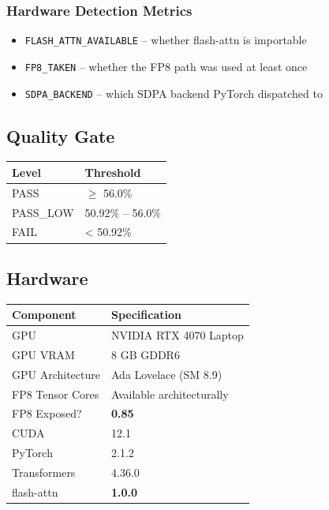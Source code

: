 \subsubsection{Hardware Detection Metrics}

\begin{itemize}
\item \texttt{FLASH\_ATTN\_AVAILABLE} -- whether flash-attn is importable
\item \texttt{FP8\_TAKEN} -- whether the FP8 path was used at least once
\item \texttt{SDPA\_BACKEND} -- which SDPA backend PyTorch dispatched to

\end{itemize}
\subsection{Quality Gate}

\begin{table}[H]
\centering
\small
\begin{tabular}{ll}
\toprule
\textbf{Level} & \textbf{Threshold} \\
\midrule
PASS & $\ge$ 56.0\% \\
PASS\_LOW & 50.92\% -- 56.0\% \\
FAIL & < 50.92\% \\
\bottomrule
\end{tabular}
\end{table}

\subsection{Hardware}

\begin{table}[H]
\centering
\small
\begin{tabular}{ll}
\toprule
\textbf{Component} & \textbf{Specification} \\
\midrule
GPU & NVIDIA RTX 4070 Laptop \\
GPU VRAM & 8 GB GDDR6 \\
GPU Architecture & Ada Lovelace (SM 8.9) \\
FP8 Tensor Cores & Available architecturally \\
FP8 Exposed? & \textbf{0.85} \\
CUDA & 12.1 \\
PyTorch & 2.1.2 \\
Transformers & 4.36.0 \\
flash-attn & \textbf{1.0.0} \\
\bottomrule
\end{tabular}
\end{table}

